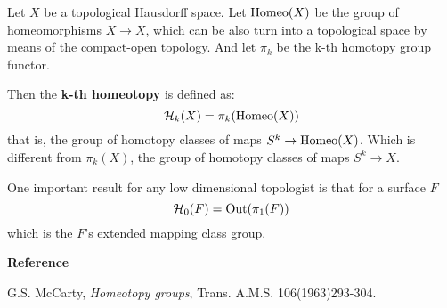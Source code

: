 \documentclass[12pt]{article}
\begin{document}
Let $X$ be a topological Hausdorff space. Let ${\rm Homeo}(X)$ be the group of homeomorphisms $X\to X$, which can be also turn into a topological space by means of the compact-open topology. And let $\pi_k$ be the k-th homotopy group functor. 

Then the {\bf k-th homeotopy} is defined as:
$${\cal{H}}_k(X)=\pi_k({\rm Homeo}(X))$$
that is, the group of homotopy classes of maps $S^k\to {\rm Homeo}(X)$.
Which is different from $\pi_k(X)$, the group of homotopy classes of maps $S^k\to X$.

One important result for any low dimensional topologist is that for a surface $F$
$${\cal{H}}_0(F)={\rm Out}(\pi_1(F))$$
which is the $F$'s extended mapping class group.

{\bf Reference}

G.S. McCarty, {\it Homeotopy groups}, Trans. A.M.S. 106(1963)293-304.
\end{document}
